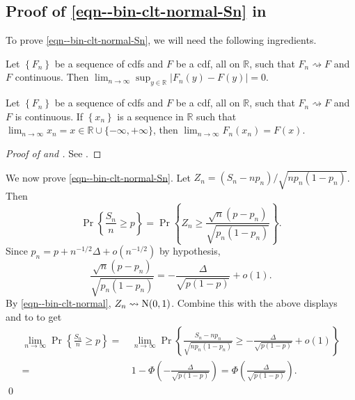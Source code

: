 \subsection{Proof of
\texorpdfstring{\eqref{eqn--bin-clt-normal-Sn}}{(\ref{eqn--bin-clt-normal-Sn})}
in \texorpdfstring{}{Theorem
\ref{thm--bin-clt-normal}}}

To prove \eqref{eqn--bin-clt-normal-Sn}, we will need the following ingredients.

\begin{theorem}
\label{thm--polya}
Let \(\left\{ F_{n} \right\}\) be a sequence of cdfs and \(F\)
be a cdf, all on \(\mathbb{R}\), such that \(F_{n} \rightsquigarrow F\) and
\(F\) continuous.
Then \(\lim_{n \to \infty} \sup_{y \in \mathbb{R}} \left| F_{n} (y) - F (y)
\right| = 0\).
\end{theorem}

\begin{corollary}
\label{cor--polya}
Let \(\left\{ F_{n} \right\}\) be a sequence of cdfs and \(F\)
be a cdf, all on \(\mathbb{R}\), such that \(F_{n} \rightsquigarrow F\) and
\(F\) is continuous.
If \(\left\{ x_{n} \right\}\) is a sequence in \(\mathbb{R}\) such that
\(\lim_{n \to \infty} x_{n} = x \in \mathbb{R} \cup \{- \infty, + \infty\}\),
then \(\lim_{n \to \infty} F_{n} \left( x_{n} \right) = F (x)\).
\end{corollary}

\begin{proof}[Proof of  and ]
See .
\end{proof}

We now prove \eqref{eqn--bin-clt-normal-Sn}.
Let \(Z_{n} = \left( S_{n} - n p_{n} \right) / \sqrt{n p_{n} \left( 1 - p_{n}
\right)}\).
Then
\begin{equation*}
  \Pr \left\{ \frac{S_{n}}{n} \geq p \right\} = \Pr \left\{ Z_{n} \geq
  \frac{\sqrt{n} \left( p - p_{n} \right)}{\sqrt{p_{n} \left( 1 - p_{n}
  \right)}} \right\}.
\end{equation*}
Since \(p_{n} = p + n^{- 1 / 2} \Delta + o \left( n^{- 1 / 2} \right)\) by
hypothesis,
\begin{equation*}
  \frac{\sqrt{n} \left( p - p_{n} \right)}{\sqrt{p_{n} \left( 1
  - p_{n} \right)}} = - \frac{\Delta}{\sqrt{p (1 - p)}} + o (1).
\end{equation*}
By \eqref{eqn--bin-clt-normal}, \(Z_{n} \rightsquigarrow \mathrm{N} (0, 1)\).
Combine this with the above displays and  to 
to get
\begin{align*}
  \lim_{n \to \infty} \Pr \left\{ \frac{S_{n}}{n} \geq p \right\} =
  & \, \lim_{n \to \infty} \Pr \left\{ \frac{S_{n} - n p_{n}}{\sqrt{n p_{n}
  \left( 1 - p_{n} \right)}} \geq - \frac{\Delta}{\sqrt{p (1 - p)}} + o (1)
  \right\} \\
  =
  & \, 1 - \Phi \left( - \frac{\Delta}{\sqrt{p (1 - p)}} \right) = \Phi \left(
  \frac{\Delta}{\sqrt{p (1 - p)}} \right).
\end{align*}
\qed

